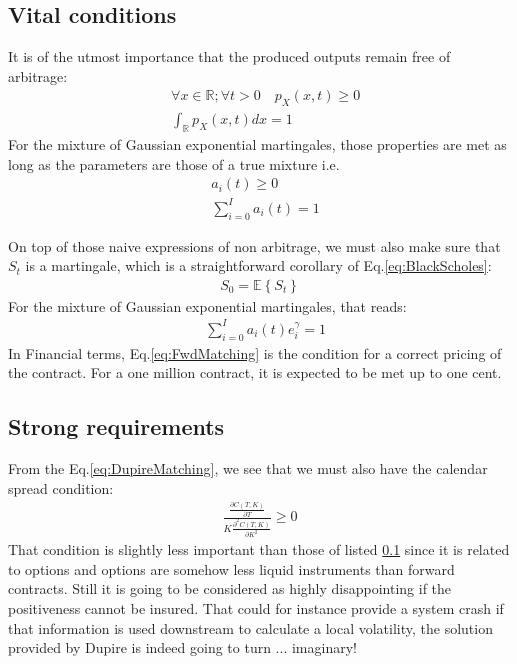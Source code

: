 \documentclass[10pt,a4paper]{article}
\begin{document}
\subsection{Vital conditions}\label{sec:vitalConditions}
It is of the utmost importance that the produced outputs remain free of arbitrage:
\begin{align}
&\forall x \in \mathbb{R};\forall t>0 \quad p_X(x,t) \geq 0\\
&\int_{\mathbb{R}} p_X(x,t) dx = 1
\end{align}
For the mixture of Gaussian exponential martingales, those properties are met as long as the parameters are those of a true mixture i.e.
\begin{align}
&a_i(t) \geq 0\\
&\sum_{i=0}^I a_i(t) = 1
\end{align}

On top of those naive expressions of non arbitrage, we must also make sure that $S_t$ is a martingale, which is a straightforward corollary of Eq.\ref{eq:BlackScholes}:
\begin{align}
S_0 = \mathbb{E}\left\lbrace S_t\right\rbrace
\end{align}
For the mixture of Gaussian exponential martingales, that reads:
\begin{align}\label{eq:FwdMatching}
&\sum_{i=0}^I a_i(t)e^\gamma_i = 1
\end{align}
In Financial terms, Eq.\ref{eq:FwdMatching} is the condition for a correct pricing of the contract. For a one million contract, it is expected to be met up to one cent.
\subsection{Strong requirements}\label{sec:strongRequirements}
From the Eq.\ref{eq:DupireMatching}, we see that we must also have the calendar spread condition:
\begin{align} \label{eq:CalendarSpread}
\frac{\frac{\partial C(T,K)}{\partial T}}{K\frac{\partial^2 C(T,K)}{\partial K^2}} \geq 0
\end{align}
That condition is slightly less important than those of listed \ref{sec:vitalConditions} since it is related to options and options are somehow less liquid instruments than forward contracts. Still it is going to be considered as highly disappointing if the positiveness cannot be insured. That could for instance provide a system crash if that information is used downstream to calculate a local volatility, the solution provided by Dupire is indeed going to turn ... imaginary!
\end{document}
